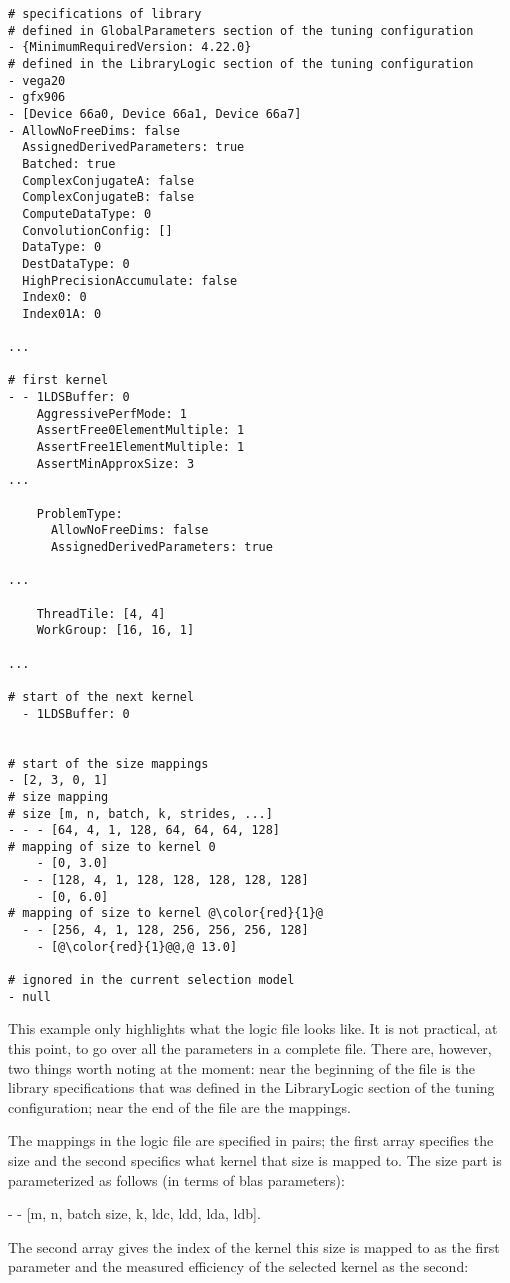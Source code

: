 \documentclass[]{article}
\begin{document}
\begin{verbatim}
# specifications of library
# defined in GlobalParameters section of the tuning configuration
- {MinimumRequiredVersion: 4.22.0}
# defined in the LibraryLogic section of the tuning configuration
- vega20
- gfx906
- [Device 66a0, Device 66a1, Device 66a7]
- AllowNoFreeDims: false
  AssignedDerivedParameters: true
  Batched: true
  ComplexConjugateA: false
  ComplexConjugateB: false
  ComputeDataType: 0
  ConvolutionConfig: []
  DataType: 0
  DestDataType: 0
  HighPrecisionAccumulate: false
  Index0: 0
  Index01A: 0

...

# first kernel
- - 1LDSBuffer: 0
    AggressivePerfMode: 1
    AssertFree0ElementMultiple: 1
    AssertFree1ElementMultiple: 1
    AssertMinApproxSize: 3
...

    ProblemType:
      AllowNoFreeDims: false
      AssignedDerivedParameters: true

...

    ThreadTile: [4, 4]
    WorkGroup: [16, 16, 1]

...

# start of the next kernel
  - 1LDSBuffer: 0


# start of the size mappings
- [2, 3, 0, 1]
# size mapping
# size [m, n, batch, k, strides, ...]
- - - [64, 4, 1, 128, 64, 64, 64, 128]
# mapping of size to kernel 0
    - [0, 3.0]
  - - [128, 4, 1, 128, 128, 128, 128, 128]
    - [0, 6.0]
# mapping of size to kernel @\color{red}{1}@
  - - [256, 4, 1, 128, 256, 256, 256, 128]
    - [@\color{red}{1}@@,@ 13.0]

# ignored in the current selection model
- null

\end{verbatim}
\noindent
This example only highlights what the logic file looks like. It is not practical, at this point, to go over all the parameters in a complete file. There are, however, two things worth noting at the moment: near the beginning of the file is the library specifications that was defined in the LibraryLogic section of the tuning configuration; near the end of the file are the mappings.

The mappings in the logic file are specified in pairs; the first array specifies the size and the second specifics what kernel that size is mapped to. The size part is parameterized as follows (in terms of blas parameters):

\begin{center}
 	- - [m, n, batch size, k, ldc, ldd, lda, ldb].
\end{center}
\noindent
The second array gives the index of the kernel this size is mapped to as the first parameter and the measured efficiency of the selected kernel as the second:
\end{document}
